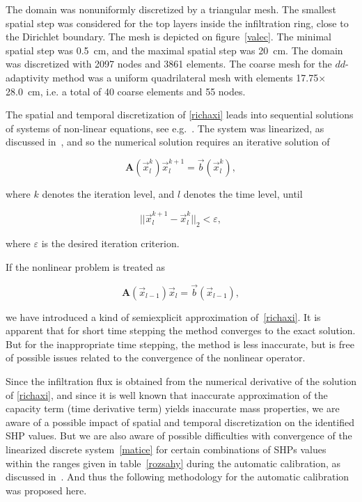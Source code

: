 \documentclass[review]{myarticle}
\newenvironment{lineq}
    {\begin{linenomath*}
    \begin{equation}
    }
    { 
    \end{equation} 
    \end{linenomath*}
    }
\begin{document}
 The domain was nonuniformly discretized by a triangular mesh. The smallest spatial step was considered for the top layers inside the infiltration ring, close to the Dirichlet boundary. The mesh is depicted on figure~\ref{valec}. The minimal spatial step was 0.5~cm, and the maximal spatial step was 20~cm. The domain was discretized with 2097 nodes and 3861 elements. The coarse mesh for the $dd$-adaptivity method was a uniform quadrilateral mesh with elements 17.75$\times$28.0~cm, i.e. a total of 40 coarse elements and 55 nodes.

 
 The spatial and temporal discretization of \eqref{richaxi} leads into sequential solutions of systems of non-linear equations, see e.g.~\citep{mojecomp}. The system was linearized, as discussed in~\citep{mojejcam2, mojeamc2}, and so the numerical solution requires an iterative solution of 
\begin{lineq}
\label{matice}
\mathbf{A}(\vec{x}_l^k) \vec{x}_l^{k+1} = \vec{b}(\vec{x}_l^k),
\end{lineq}
where $k$ denotes the iteration level, and $l$ denotes the time level, until \begin{lineq} \label{picard} ||\vec{x}_l^{k+1} - \vec{x}_l^k||_2 < \varepsilon , \end{lineq} where $\varepsilon$ is the desired iteration criterion.

If the nonlinear problem is treated as 
\begin{lineq}
\label{matice2}
\mathbf{A}(\vec{x}_{l-1}) \vec{x}_l = \vec{b}(\vec{x}_{l-1}),
\end{lineq}
 we have introduced a kind of semiexplicit approximation  
of~\eqref{richaxi}. It is apparent that for short time stepping the method converges to the exact solution. But for the inappropriate time stepping, the method is less inaccurate, but is free of possible issues related to the convergence of the nonlinear operator.

Since the infiltration flux is obtained from the numerical derivative of the solution of \eqref{richaxi},  and since it is well known that inaccurate approximation of the capacity term (time derivative term) yields inaccurate mass properties, we are aware of a possible impact of spatial and temporal discretization on the identified SHP values. But we are also aware of possible difficulties with convergence of the linearized discrete system~\eqref{matice} for certain combinations of SHPs values within the ranges given in table~\ref{rozsahy} during the automatic calibration, as discussed in~\cite{beven2003-uncertain}.
And thus the following methodology for the automatic calibration was proposed here.
\end{document}

